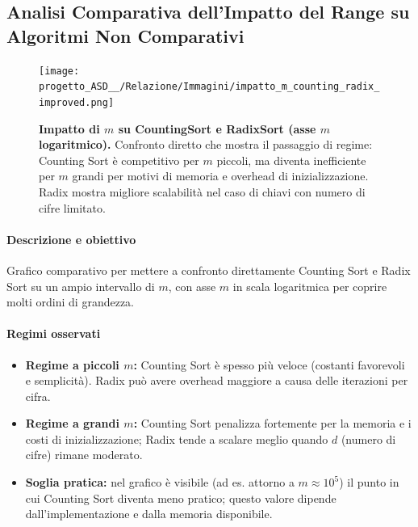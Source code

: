 \documentclass[a4paper, 11pt]{article}
\begin{document}
\subsection{Analisi Comparativa dell'Impatto del Range su Algoritmi Non Comparativi}
\begin{figure}[H]
\centering
\texttt{[image: progetto\_ASD\_\_/Relazione/Immagini/impatto\_m\_counting\_radix\_improved.png]}
\caption{\textbf{Impatto di \(m\) su CountingSort e RadixSort (asse \(m\) logaritmico).} Confronto diretto che mostra il passaggio di regime: Counting Sort è competitivo per \(m\) piccoli, ma diventa inefficiente per \(m\) grandi per motivi di memoria e overhead di inizializzazione. Radix mostra migliore scalabilità nel caso di chiavi con numero di cifre limitato.}
\label{fig:variazione_m}
\end{figure}

\paragraph{Descrizione e obiettivo}
Grafico comparativo per mettere a confronto direttamente Counting Sort e Radix Sort su un ampio intervallo di \(m\), con asse \(m\) in scala logaritmica per coprire molti ordini di grandezza.

\paragraph{Regimi osservati}
\begin{itemize}
  \item \textbf{Regime a piccoli \(m\):} Counting Sort è spesso più veloce (costanti favorevoli e semplicità). Radix può avere overhead maggiore a causa delle iterazioni per cifra.
  \item \textbf{Regime a grandi \(m\):} Counting Sort penalizza fortemente per la memoria e i costi di inizializzazione; Radix tende a scalare meglio quando \(d\) (numero di cifre) rimane moderato.
  \item \textbf{Soglia pratica:} nel grafico è visibile (ad es. attorno a \(m\approx 10^5\)) il punto in cui Counting Sort diventa meno pratico; questo valore dipende dall'implementazione e dalla memoria disponibile.
\end{itemize}
\end{document}
